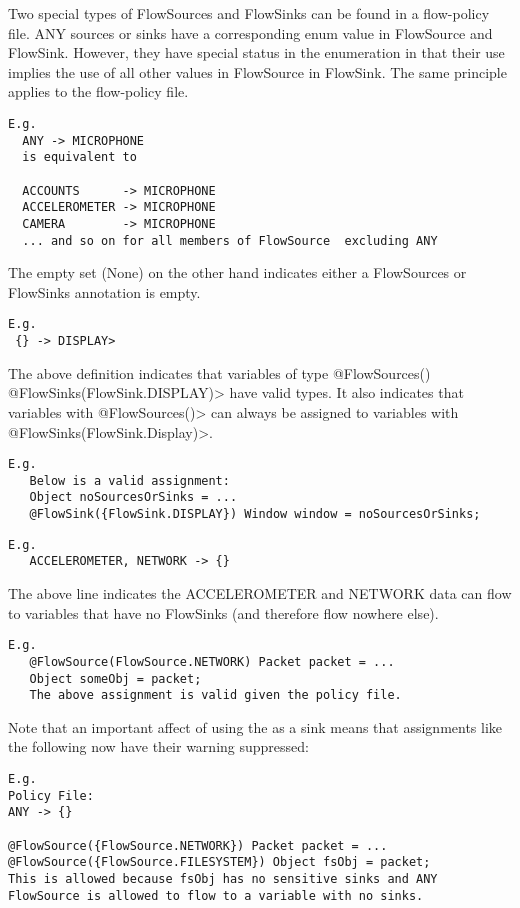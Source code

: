 Two special types of FlowSources and FlowSinks can be found in
a flow-policy file.  ANY sources or sinks have a corresponding
enum value in FlowSource and FlowSink.  However, they have
special status in the enumeration in that their use implies
the use of all other values in FlowSource in FlowSink.  The
same principle applies to the flow-policy file.
\begin{Verbatim}
E.g.
  ANY -> MICROPHONE
  is equivalent to

  ACCOUNTS      -> MICROPHONE
  ACCELEROMETER -> MICROPHONE
  CAMERA        -> MICROPHONE
  ... and so on for all members of FlowSource  excluding ANY
\end{Verbatim}

The empty set {} (None) on the other hand indicates either a
FlowSources or FlowSinks annotation is empty.
\begin{Verbatim}
E.g.
 {} -> DISPLAY>
\end{Verbatim}
The above definition indicates that variables of type
\<@FlowSources({}) @FlowSinks(FlowSink.DISPLAY)> have valid
types. It also indicates that variables with
\<@FlowSources({})> can always be assigned to variables with
\<@FlowSinks(FlowSink.Display)>.

\begin{Verbatim}
E.g.
   Below is a valid assignment:
   Object noSourcesOrSinks = ...
   @FlowSink({FlowSink.DISPLAY}) Window window = noSourcesOrSinks;
\end{Verbatim}

\begin{Verbatim}
E.g.
   ACCELEROMETER, NETWORK -> {}
\end{Verbatim}

The above line indicates the ACCELEROMETER and NETWORK
data can flow to variables that have no FlowSinks (and
therefore flow nowhere else).

\begin{Verbatim}
E.g.
   @FlowSource(FlowSource.NETWORK) Packet packet = ...
   Object someObj = packet;
   The above assignment is valid given the policy file.
\end{Verbatim}

Note that an important affect of using the {} as a sink means
that assignments like the following now have their warning
suppressed:

\begin{Verbatim}
E.g.
Policy File:
ANY -> {}

@FlowSource({FlowSource.NETWORK}) Packet packet = ...
@FlowSource({FlowSource.FILESYSTEM}) Object fsObj = packet;
This is allowed because fsObj has no sensitive sinks and ANY FlowSource is allowed to flow to a variable with no sinks.
\end{Verbatim}

